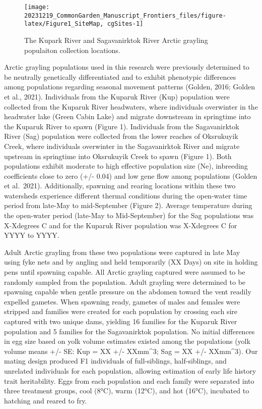 \documentclass[utf8]{frontiersSCNS}
\begin{document}
\begin{figure}

{\centering \texttt{[image: 20231219\_CommonGarden\_Manuscript\_Frontiers\_files/figure-latex/Figure1\_SiteMap, cgSites-1]} 

}

\caption{The Kupark River and Sagavanirktok River Arctic grayling populaiton collection locations.}\label{fig:Figure1_SiteMap, cgSites}
\end{figure}

Arctic grayling populations used in this research were previously
determined to be neutrally genetically differentiated and to exhibit
phenotypic differences among populations regarding seasonal movement
patterns (Golden, 2016; Golden et al., 2021). Individuals from the
Kuparuk River (Kup) population were collected from the Kuparuk River
headwaters, where individuals overwinter in the headwater lake (Green
Cabin Lake) and migrate downstream in springtime into the Kuparuk River
to spawn (Figure 1). Individuals from the Sagavanirktok River (Sag)
population were collected from the lower reaches of Oksrukuyik Creek,
where individuals overwinter in the Sagavanirktok River and migrate
upstream in springtime into Oksrukuyik Creek to spawn (Figure 1). Both
populations exhibit moderate to high effective population size (Ne),
inbreeding coefficients close to zero (+/- 0.04) and low gene flow among
populations (Golden et al.~2021). Additionally, spawning and rearing
locations within these two watersheds experience different thermal
conditions during the open-water time period from late-May to
mid-September (Figure 2). Average temperature during the open-water
period (late-May to Mid-September) for the Sag populations was
X-Xdegrees C and for the Kuparuk River population was X-Xdegrees C for
YYYY to YYYY.

Adult Arctic grayling from these two populations were captured in late
May using fyke nets and by angling and held temporarily (XX Days) on
site in holding pens until spawning capable. All Arctic grayling
captured were assumed to be randomly sampled from the population. Adult
grayling were determined to be spawning capable when gentle pressure on
the abdomen toward the vent readily expelled gametes. When spawning
ready, gametes of males and females were stripped and families were
created for each population by crossing each sire captured with two
unique dams, yielding 16 families for the Kuparuk River population and 5
families for the Sagavanirktok population. No initial differences in egg
size based on yolk volume estimates existed among the populations (yolk
volume means +/- SE: Kup = XX +/- XXmm\^{}3; Sag = XX +/- XXmm\^{}3).
Our mating design produced F1 individuals of full-siblings,
half-siblings, and unrelated individuals for each population, allowing
estimation of early life history trait heritability. Eggs from each
population and each family were separated into three treatment groups,
cool (8°C), warm (12°C), and hot (16°C), incubated to hatching and
reared to fry.
\end{document}
